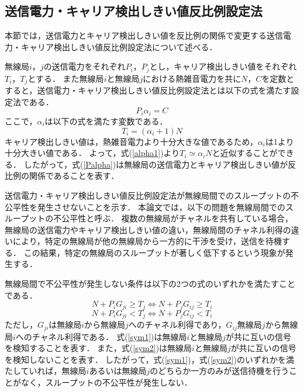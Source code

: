 \documentclass[master]{kuisthesis}		%
\begin{document}
\subsection{送信電力・キャリア検出しきい値反比例設定法}\label{反比例}
本節では，送信電力とキャリア検出しきい値を反比例の関係で変更する送信電力・キャリア検出しきい値反比例設定法について述べる．

無線局$i$，$j$の送信電力をそれぞれ$P_i$，$P_j$とし，キャリア検出しきい値をそれぞれ$T_i$，$T_j$とする．
また無線局$i$と無線局$j$における熱雑音電力を共に$N$，$C$を定数とすると，送信電力・キャリア検出しきい値反比例設定法とは以下の式を満たす設定法である．
\begin{equation}
\label{Palpha}
P_i\alpha_i = C
\end{equation}
ここで，$\alpha_i$は以下の式を満たす変数である．
\begin{equation}
\label{alpha1}
T_i = (\alpha_i + 1)N 
\end{equation}
キャリア検出しきい値は，熱雑音電力より十分大きな値であるため，$\alpha_i$は1より十分大きい値である．
よって，式(\ref{alpha1})より$T_i \simeq \alpha_iN$と近似することができる．
したがって，式(\ref{Palpha})は無線局の送信電力とキャリア検出しきい値が反比例の関係であることを表す．

送信電力・キャリア検出しきい値反比例設定法が無線局間でのスループットの不公平性を発生させないことを示す．
本論文では，以下の問題を無線局間でのスループットの不公平性と呼ぶ．
複数の無線局がチャネルを共有している場合，無線局の送信電力やキャリア検出しきい値の違い，無線局間のチャネル利得の違いにより，特定の無線局が他の無線局から一方的に干渉を受け，送信を待機する．
この結果，特定の無線局のスループットが著しく低下するという現象が発生する\cite{starvation_modeling}．

無線局間で不公平性が発生しない条件は以下の2つの式のいずれかを満たすことである．
\begin{equation}
\label{sym1}
N + P_i G_{ji} \geq T_j  \Leftrightarrow  N + P_j G_{ij} \geq T_i%
\end{equation}
\begin{equation}
\label{sym2}
N + P_i G_{ji} < T_j  \Leftrightarrow  N + P_j G_{ij} < T_i
\end{equation}
ただし，$G_{ji}$は無線局$i$から無線局$j$へのチャネル利得であり，$G_{ij}$無線局$j$から無線局$i$へのチャネル利得である．
式(\ref{sym1})は無線局$i$と無線局$j$が共に互いの信号を検知することを表す．
また，式(\ref{sym2})は無線局$i$と無線局$j$が共に互いの信号を検知しないことを表す．
したがって，式(\ref{sym1})，式(\ref{sym2})のいずれかを満たしていれば，無線局$i$あるいは無線局$j$のどちらか一方のみが送信待機を行うことがなく，スループットの不公平性が発生しない．
\end{document}

